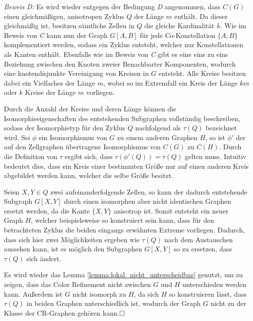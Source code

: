 \emph{Beweis D:} Es wird wieder entgegen der Bedingung \emph{D} angenommen, dass $C(G)$ einen gleichmäßigen, anisotropen Zyklus $Q$ der Länge $m$ enthält.
Da dieser gleichmäßig ist, besitzen sämtliche Zellen in $Q$ die gleiche Kardinalität $k$.
Wie im Beweis von \emph{C} kann nun der Graph $G[A,B]$ für jede Co-Konstellation $\{A,B\}$ komplementiert werden, sodass ein Zyklus entsteht, welcher nur Konstellationen als Kanten enthält.
Ebenfalls wie im Beweis von \emph{C} gibt es eine eins zu eins Beziehung zwischen den Knoten zweier Benachbarter Komponenten, wodurch eine knotendisjunkte Vereinigung von Kreisen in $G$ entsteht.
Alle Kreise besitzen dabei ein Vielfaches der Länge $m$, wobei so im Extremfall ein Kreis der Länge $km$ oder $k$ Kreise der Länge $m$ vorliegen.

Durch die Anzahl der Kreise und deren Länge können die Isomorphieeigenschaften des entstehenden Subgraphen vollständig beschreiben, sodass der Isomorphietyp für den Zyklus $Q$ nachfolgend als $\tau (Q)$ bezeichnet wird.
Sei $\phi $ ein Isomorphismus von $G$ zu einem anderen Graphen $H$, so ist $\phi '$ der auf den Zellgraphen übertragene Isomorphismus von $C(G)$ zu $C(H)$.
Durch die Definition von $\tau $ ergibt sich, dass $\tau (\phi '(Q))=\tau (Q)$ gelten muss.
Intuitiv bedeutet dies, dass ein Kreis einer bestimmten Größe nur auf einen anderen Kreis abgebildet werden kann, welcher die selbe Größe besitzt.

Seien $X,Y\in Q$ zwei aufeinanderfolgende Zellen, so kann der dadurch entstehende Subgraph $G[X,Y]$ durch einen isomorphen aber nicht identischen Graphen ersetzt werden, da die Kante $\{X,Y\}$ anisotrop ist.
Somit entsteht ein neuer Graph $H$, welcher beispielsweise so konstruiert sein kann, dass für den betrachteten Zyklus die beiden eingangs erwähnten Extreme vorliegen.
Dadurch, dass sich hier zwei Möglichkeiten ergeben wie $\tau (Q)$ nach dem Austauschen aussehen kann, ist es möglich den Subgraphen $G[X,Y]$ so zu ersetzen, dass $\tau (Q)$ sich ändert.

Es wird wieder das Lemma \ref{lemma:lokal_nicht_unterscheidbar} genutzt, um zu zeigen, dass das Color Refinement nicht zwischen $G$ und $H$ unterschieden werden kann.
Außerdem ist $G$ nicht isomorph zu $H$, da sich $H$ so konstruieren lässt, dass $\tau (Q)$ in beiden Graphen unterschiedlich ist, wodurch der Graph $G$ nicht zu der Klasse der CR-Graphen gehören kann.$\hfill\square$\\

